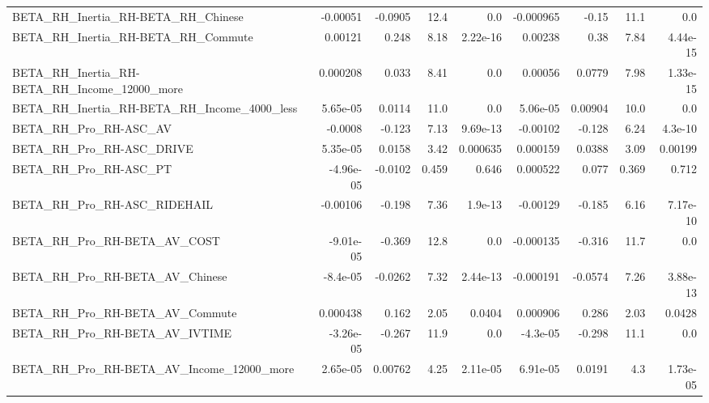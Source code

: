 \begin{tabular}{lrrrrrrrr}
BETA\_RH\_Inertia\_RH-BETA\_RH\_Chinese                 &    -0.00051 &      -0.0905 &     12.4 &      0.0 &  -0.000965 &       -0.15 &         11.1 &           0.0 \\
BETA\_RH\_Inertia\_RH-BETA\_RH\_Commute                 &     0.00121 &        0.248 &     8.18 & 2.22e-16 &    0.00238 &        0.38 &         7.84 &      4.44e-15 \\
BETA\_RH\_Inertia\_RH-BETA\_RH\_Income\_12000\_more       &    0.000208 &        0.033 &     8.41 &      0.0 &    0.00056 &      0.0779 &         7.98 &      1.33e-15 \\
BETA\_RH\_Inertia\_RH-BETA\_RH\_Income\_4000\_less        &    5.65e-05 &       0.0114 &     11.0 &      0.0 &   5.06e-05 &     0.00904 &         10.0 &           0.0 \\
BETA\_RH\_Pro\_RH-ASC\_AV                              &     -0.0008 &       -0.123 &     7.13 & 9.69e-13 &   -0.00102 &      -0.128 &         6.24 &       4.3e-10 \\
BETA\_RH\_Pro\_RH-ASC\_DRIVE                           &    5.35e-05 &       0.0158 &     3.42 & 0.000635 &   0.000159 &      0.0388 &         3.09 &       0.00199 \\
BETA\_RH\_Pro\_RH-ASC\_PT                              &   -4.96e-05 &      -0.0102 &    0.459 &    0.646 &   0.000522 &       0.077 &        0.369 &         0.712 \\
BETA\_RH\_Pro\_RH-ASC\_RIDEHAIL                        &    -0.00106 &       -0.198 &     7.36 &  1.9e-13 &   -0.00129 &      -0.185 &         6.16 &      7.17e-10 \\
BETA\_RH\_Pro\_RH-BETA\_AV\_COST                        &   -9.01e-05 &       -0.369 &     12.8 &      0.0 &  -0.000135 &      -0.316 &         11.7 &           0.0 \\
BETA\_RH\_Pro\_RH-BETA\_AV\_Chinese                     &    -8.4e-05 &      -0.0262 &     7.32 & 2.44e-13 &  -0.000191 &     -0.0574 &         7.26 &      3.88e-13 \\
BETA\_RH\_Pro\_RH-BETA\_AV\_Commute                     &    0.000438 &        0.162 &     2.05 &   0.0404 &   0.000906 &       0.286 &         2.03 &        0.0428 \\
BETA\_RH\_Pro\_RH-BETA\_AV\_IVTIME                      &   -3.26e-05 &       -0.267 &     11.9 &      0.0 &   -4.3e-05 &      -0.298 &         11.1 &           0.0 \\
BETA\_RH\_Pro\_RH-BETA\_AV\_Income\_12000\_more           &    2.65e-05 &      0.00762 &     4.25 & 2.11e-05 &   6.91e-05 &      0.0191 &          4.3 &      1.73e-05 \\

\end{tabular}
